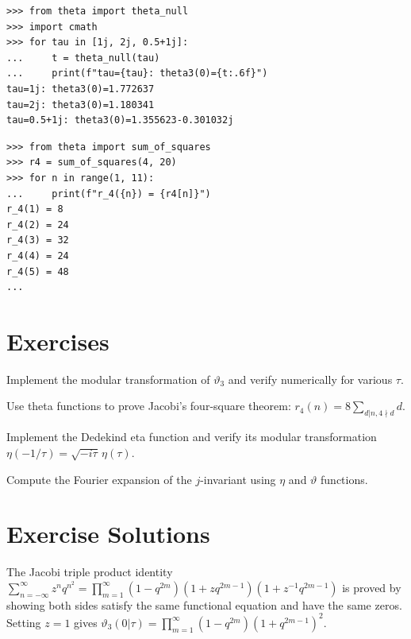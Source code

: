 \begin{example}
\begin{lstlisting}[style=python]
>>> from theta import theta_null
>>> import cmath
>>> for tau in [1j, 2j, 0.5+1j]:
...     t = theta_null(tau)
...     print(f"tau={tau}: theta3(0)={t:.6f}")
tau=1j: theta3(0)=1.772637
tau=2j: theta3(0)=1.180341
tau=0.5+1j: theta3(0)=1.355623-0.301032j
\end{lstlisting}
\end{example}

\begin{example}
\begin{lstlisting}[style=python]
>>> from theta import sum_of_squares
>>> r4 = sum_of_squares(4, 20)
>>> for n in range(1, 11):
...     print(f"r_4({n}) = {r4[n]}")
r_4(1) = 8
r_4(2) = 24
r_4(3) = 32
r_4(4) = 24
r_4(5) = 48
...
\end{lstlisting}
\end{example}

\section{Exercises}

\begin{exercise}
Implement the modular transformation of $\vartheta_3$ and verify numerically for various $\tau$.
\end{exercise}

\begin{exercise}
Use theta functions to prove Jacobi's four-square theorem: $r_4(n) = 8 \sum_{d|n, 4\nmid d} d$.
\end{exercise}

\begin{exercise}
Implement the Dedekind eta function and verify its modular transformation $\eta(-1/\tau) = \sqrt{-i\tau}\, \eta(\tau)$.
\end{exercise}

\begin{exercise}
Compute the Fourier expansion of the $j$-invariant using $\eta$ and $\vartheta$ functions.
\end{exercise}



\section{Exercise Solutions}

\begin{solution}
The Jacobi triple product identity $\sum_{n=-\infty}^{\infty} z^n q^{n^2} = \prod_{m=1}^{\infty}(1-q^{2m})(1+zq^{2m-1})(1+z^{-1}q^{2m-1})$ is proved by showing both sides satisfy the same functional equation and have the same zeros. Setting $z = 1$ gives $\vartheta_3(0|\tau) = \prod_{m=1}^{\infty}(1-q^{2m})(1+q^{2m-1})^2$.
\end{solution}

